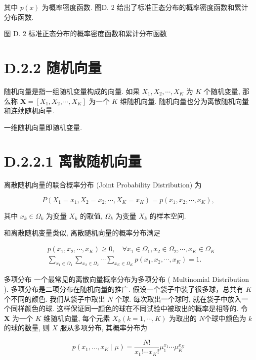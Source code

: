 \documentclass[10pt]{article}
\begin{document}
其中 $p(x)$ 为概率密度函数. 图D. 2 给出了标准正态分布的概率密度函数和累计分布函数.



图 D. 2 标准正态分布的概率密度函数和累计分布函数

\section*{D.2.2 随机向量}
随机向量是指一组随机变量构成的向量. 如果 $X_{1}, X_{2}, \cdots, X_{K}$ 为 $K$ 个随机变量, 那么称 $\boldsymbol{X}=\left[X_{1}, X_{2}, \cdots, X_{K}\right]$ 为一个 $K$ 维随机向量. 随机向量也分为离散随机向量和连续随机向量.

一维随机向量即随机变量.

\section*{D.2.2.1 离散随机向量}
离散随机向量的联合概率分布 (Joint Probability Distribution) 为

$$
P\left(X_{1}=x_{1}, X_{2}=x_{2}, \cdots, X_{K}=x_{K}\right)=p\left(x_{1}, x_{2}, \cdots, x_{K}\right),
$$

其中 $x_{k} \in \Omega_{k}$ 为变量 $X_{k}$ 的取值, $\Omega_{k}$ 为变量 $X_{k}$ 的样本空间.

和离散随机变量类似, 离散随机向量的概率分布满足


\begin{align*}
& p\left(x_{1}, x_{2}, \cdots, x_{K}\right) \geq 0, \quad \forall x_{1} \in \Omega_{1}, x_{2} \in \Omega_{2}, \cdots, x_{K} \in \Omega_{K}  \tag{D.16}\\
& \sum_{x_{1} \in \Omega_{1}} \sum_{x_{2} \in \Omega_{2}} \cdots \sum_{x_{K} \in \Omega_{K}} p\left(x_{1}, x_{2}, \cdots, x_{K}\right)=1 . \tag{D.17}
\end{align*}


多项分布 一个最常见的离散向量概率分布为多项分布 ( Multinomial Distribution ). 多项分布是二项分布在随机向量的推广. 假设一个袋子中装了很多球，总共有 $K$ 个不同的颜色. 我们从袋子中取出 $N$ 个球. 每次取出一个球时, 就在袋子中放入一个同样颜色的球. 这样保证同一颜色的球在不同试验中被取出的概率是相等的. 令 $\boldsymbol{X}$ 为一个 $K$ 维随机向量, 每个元素 $X_{k}(k=1, \cdots, K)$ 为取出的 $N$个球中颜色为 $k$ 的球的数量, 则 $X$ 服从多项分布, 其概率分布为


\begin{equation*}
p\left(x_{1}, \ldots, x_{K} \mid \mu\right)=\frac{N !}{x_{1} ! \cdots x_{K} !} \mu_{1}^{x_{1}} \cdots \mu_{K}^{x_{K}} \tag{D.18}
\end{equation*}
\end{document}

